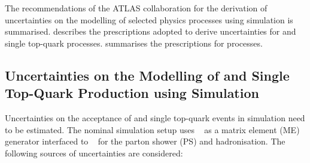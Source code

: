 The recommendations of the ATLAS collaboration for the derivation of
uncertainties on the modelling of selected physics processes using simulation is
summarised.  describes the prescriptions adopted to
derive uncertainties for \ttbar and single top-quark
processes.  summarises the prescriptions for
\Zjets processes.


\subsection{Uncertainties on the Modelling of \ttbar and Single Top-Quark
  Production using Simulation}%
\label{app:top_uncertainties}

Uncertainties on the acceptance of \ttbar and single top-quark events in
simulation need to be estimated. The nominal simulation setup uses
\POWHEGBOX[v2]~\cite{Frixione:2007nw} as a matrix element (ME) generator
interfaced to \PYTHIA[8.230]~\cite{Sjostrand:2014zea} for the parton shower (PS)
and hadronisation. The following sources of uncertainties are considered:

